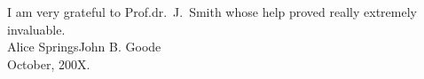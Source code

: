 
\acknowledgments

I am very grateful to Prof.dr.\ J.\ Smith whose help proved really extremely
invaluable.\\[2ex]				
Alice Springs\hfill John B. Goode\\
October, 200X.

